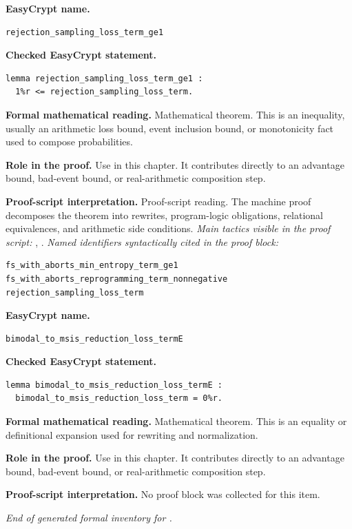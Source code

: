 \begin{formaltheorem}
\noindent\textbf{EasyCrypt name.}
\begin{lstlisting}[language=EasyCrypt,basicstyle=\ttfamily\scriptsize]
rejection_sampling_loss_term_ge1
\end{lstlisting}
\noindent\textbf{Checked EasyCrypt statement.}
\begin{lstlisting}[language=EasyCrypt,basicstyle=\ttfamily\scriptsize]
lemma rejection_sampling_loss_term_ge1 :
  1%r <= rejection_sampling_loss_term.
\end{lstlisting}
\noindent\textbf{Formal mathematical reading.}
Mathematical theorem. This is an inequality, usually an arithmetic loss bound, event inclusion bound, or monotonicity fact used to compose probabilities.

\noindent\textbf{Role in the proof.}
Use in this chapter. It contributes directly to an advantage bound, bad-event bound, or real-arithmetic composition step.

\noindent\textbf{Proof-script interpretation.}
Proof-script reading. The machine proof decomposes the theorem into rewrites, program-logic obligations, relational equivalences, and arithmetic side conditions.
\emph{Main tactics visible in the proof script:} , .
\emph{Named identifiers syntactically cited in the proof block:}
\begin{lstlisting}[language=EasyCrypt,basicstyle=\ttfamily\scriptsize]
fs_with_aborts_min_entropy_term_ge1
fs_with_aborts_reprogramming_term_nonnegative
rejection_sampling_loss_term
\end{lstlisting}

\end{formaltheorem}

\begin{formaltheorem}
\noindent\textbf{EasyCrypt name.}
\begin{lstlisting}[language=EasyCrypt,basicstyle=\ttfamily\scriptsize]
bimodal_to_msis_reduction_loss_termE
\end{lstlisting}
\noindent\textbf{Checked EasyCrypt statement.}
\begin{lstlisting}[language=EasyCrypt,basicstyle=\ttfamily\scriptsize]
lemma bimodal_to_msis_reduction_loss_termE :
  bimodal_to_msis_reduction_loss_term = 0%r.
\end{lstlisting}
\noindent\textbf{Formal mathematical reading.}
Mathematical theorem. This is an equality or definitional expansion used for rewriting and normalization.

\noindent\textbf{Role in the proof.}
Use in this chapter. It contributes directly to an advantage bound, bad-event bound, or real-arithmetic composition step.

\noindent\textbf{Proof-script interpretation.}
No proof block was collected for this item.

\end{formaltheorem}

\medskip
\noindent\emph{End of generated formal inventory for .}
